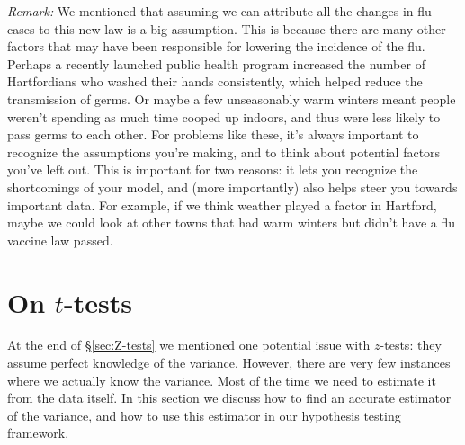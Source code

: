 \emph{Remark:} \nb We mentioned that assuming we can attribute all the changes in flu cases to this new law is a big assumption.  This is because there are many other factors that may have been responsible for lowering the incidence of the flu.  Perhaps a recently launched public health program increased the number of Hartfordians who washed their hands consistently, which helped reduce the transmission of germs.  Or maybe a few unseasonably warm winters meant people weren't spending as much time cooped up indoors, and thus were less likely to pass germs to each other.  For problems like these, it's always important to recognize the assumptions you're making, and to think about potential factors you've left out.  This is important for two reasons: it lets you recognize the shortcomings of your model, and (more importantly) also helps steer you towards important data.  For example, if we think weather played a factor in Hartford, maybe we could look at other towns that had warm winters but didn't have a flu vaccine law passed.

\section{On $t$-tests} \label{sec:T-tests}

At the end of \S\ref{sec:Z-tests} we mentioned one potential issue with $z$-tests: they assume perfect knowledge of the variance. However, there are very few instances where we actually know the variance. Most of the time we need to estimate it from the data itself. In this section we discuss how to find an accurate estimator of the variance, and how to use this estimator in our hypothesis testing framework.





